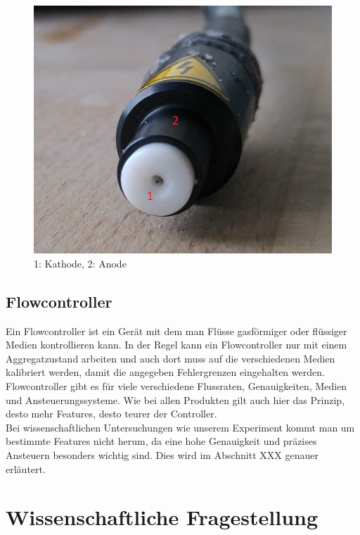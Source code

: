 \begin{figure}[h]
	\begin{center}
		\includegraphics[scale=0.2]{Einleitung_Ionisator.jpg}
		\caption{1: Kathode, 2: Anode}
	\end{center}
\end{figure}



\subsection{Flowcontroller}

Ein Flowcontroller ist ein Gerät mit dem man Flüsse gasförmiger oder flüssiger Medien kontrollieren kann. In der Regel kann ein Flowcontroller nur mit einem Aggregatzustand arbeiten und auch dort muss auf die verschiedenen Medien kalibriert werden, damit die angegeben Fehlergrenzen eingehalten werden. \\
Flowcontroller gibt es für viele verschiedene Flussraten, Genauigkeiten, Medien und Ansteuerungssysteme. Wie bei allen Produkten gilt auch hier das Prinzip, desto mehr Features, desto teurer der Controller. \\
Bei wissenschaftlichen Untersuchungen wie unserem Experiment kommt man um bestimmte Features nicht herum, da eine hohe Genauigkeit und präzises Ansteuern besonders wichtig sind. Dies wird im Abschnitt XXX genauer erläutert.



\section{Wissenschaftliche Fragestellung}

